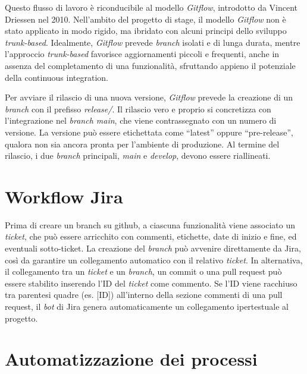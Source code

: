 \vspace{10pt}
\par\noindent Questo flusso di lavoro è riconducibile al modello \textit{Gitflow}, introdotto da Vincent Driessen nel 2010. Nell’ambito del progetto di stage, il modello \textit{Gitflow} non è stato applicato in modo rigido, ma ibridato con alcuni principi dello sviluppo \textit{trunk-based}. Idealmente, \textit{Gitflow} prevede \textit{branch} isolati e di lunga durata, mentre l’approccio \textit{trunk-based} favorisce aggiornamenti piccoli e frequenti, anche in assenza del completamento di una funzionalità, sfruttando appieno il potenziale della \gls{continuous integration}.

\vspace{10pt}
\par\noindent Per avviare il rilascio di una nuova versione, \textit{Gitflow} prevede la creazione di un \textit{branch} con il prefisso \textit{release/}. Il rilascio vero e proprio si concretizza con l’integrazione nel \textit{branch main}, che viene contrassegnato con un numero di versione. La versione può essere etichettata come “latest” oppure “pre-release”, qualora non sia ancora pronta per l’ambiente di produzione. Al termine del rilascio, i due \textit{branch} principali, \textit{main} e \textit{develop}, devono essere riallineati.

\section{Workflow Jira}

\par Prima di creare un branch su \gls{github}, a ciascuna funzionalità viene associato un \textit{ticket}, che può essere arricchito con commenti, etichette, date di inizio e fine, ed eventuali sotto-ticket. La creazione del \textit{branch} può avvenire direttamente da Jira, così da garantire un collegamento automatico con il relativo \textit{ticket}. In alternativa, il collegamento tra un \textit{ticket} e un \textit{branch}, un \gls{commit} o una \gls{pull request} può essere stabilito inserendo l’ID del \textit{ticket} come commento. Se l’ID viene racchiuso tra parentesi quadre (es. [ID]) all’interno della sezione commenti di una \gls{pull request}, il \textit{bot} di Jira genera automaticamente un collegamento ipertestuale al progetto.

\section{Automatizzazione dei processi}

